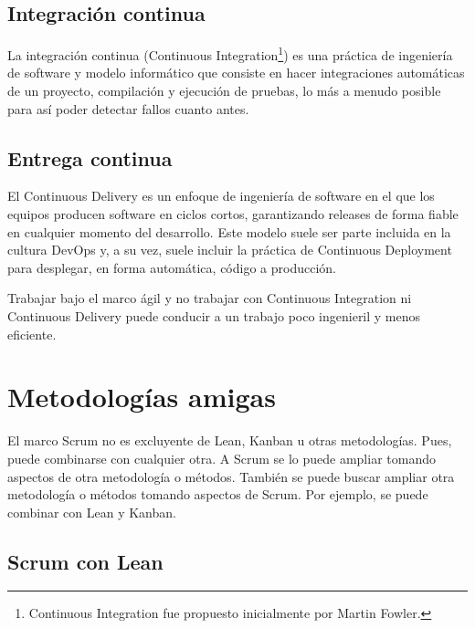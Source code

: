 \subsection{Integración continua}

La integración continua (Continuous Integration\footnote{Continuous Integration fue propuesto inicialmente por Martin Fowler.}) es una práctica de ingeniería de software y modelo informático que consiste en hacer integraciones automáticas de un proyecto, compilación y ejecución de pruebas, lo más a menudo posible para así poder detectar fallos cuanto antes.

\subsection{Entrega continua}

El Continuous Delivery es un enfoque de ingeniería de software en el que los equipos producen software en ciclos cortos, garantizando releases de forma fiable en cualquier momento del desarrollo. Este modelo suele ser parte incluida en la cultura DevOps y, a su vez, suele incluir la práctica de Continuous Deployment para desplegar, en forma automática, código a producción.

Trabajar bajo el marco ágil y no trabajar con Continuous Integration ni Continuous Delivery puede conducir a un trabajo poco ingenieril y menos eficiente.

\newpage
\section{Metodologías amigas}

El marco Scrum no es excluyente de Lean, Kanban u otras metodologías. Pues, puede combinarse con cualquier otra. A Scrum se lo puede ampliar tomando aspectos de otra metodología o métodos. También se puede buscar ampliar otra metodología o métodos tomando aspectos de Scrum. Por ejemplo, se puede combinar con Lean y Kanban.

\subsection{Scrum con Lean}


